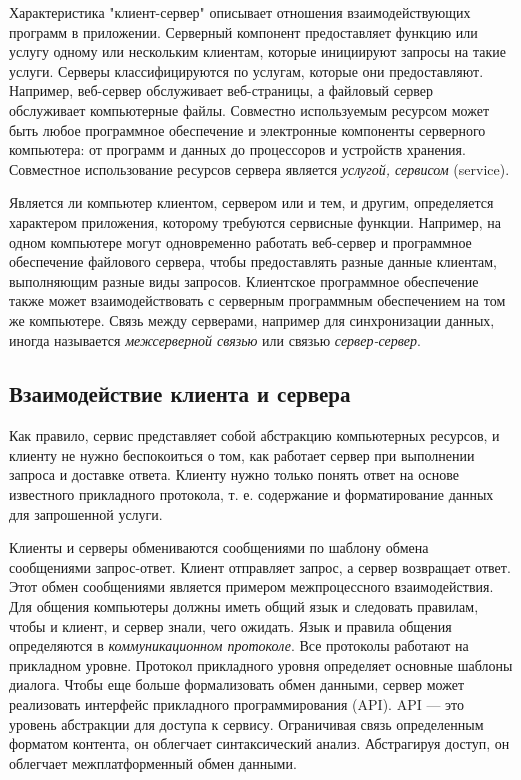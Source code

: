 Характеристика "клиент-сервер" описывает отношения взаимодействующих программ в приложении.
Серверный компонент предоставляет функцию или услугу одному или нескольким клиентам, которые инициируют запросы на такие услуги.
Серверы классифицируются по услугам, которые они предоставляют.
Например, веб-сервер обслуживает веб-страницы, а файловый сервер обслуживает компьютерные файлы.
Совместно используемым ресурсом может быть любое программное обеспечение и электронные компоненты серверного компьютера: от программ и данных до процессоров и устройств хранения.
Совместное использование ресурсов сервера является \textit{услугой, сервисом} (service).

Является ли компьютер клиентом, сервером или и тем, и другим, определяется характером приложения, которому требуются сервисные функции.
Например, на одном компьютере могут одновременно работать веб-сервер и программное обеспечение файлового сервера, чтобы предоставлять разные данные клиентам, выполняющим разные виды запросов.
Клиентское программное обеспечение также может взаимодействовать с серверным программным обеспечением на том же компьютере.
Связь между серверами, например для синхронизации данных, иногда называется \textit{межсерверной связью} или связью \textit{сервер-сервер}.

\subsection{Взаимодействие клиента и сервера}

Как правило, сервис представляет собой абстракцию компьютерных ресурсов, и клиенту не нужно беспокоиться о том, как работает сервер при выполнении запроса и доставке ответа.
Клиенту нужно только понять ответ на основе известного прикладного протокола, т. е. содержание и форматирование данных для запрошенной услуги.

Клиенты и серверы обмениваются сообщениями по шаблону обмена сообщениями запрос-ответ.
Клиент отправляет запрос, а сервер возвращает ответ.
Этот обмен сообщениями является примером межпроцессного взаимодействия.
Для общения компьютеры должны иметь общий язык и следовать правилам, чтобы и клиент, и сервер знали, чего ожидать.
Язык и правила общения определяются в \textit{коммуникационном протоколе}.
Все протоколы работают на прикладном уровне.
Протокол прикладного уровня определяет основные шаблоны диалога.
Чтобы еще больше формализовать обмен данными, сервер может реализовать интерфейс прикладного программирования (API). 
API — это уровень абстракции для доступа к сервису.
Ограничивая связь определенным форматом контента, он облегчает синтаксический анализ.
Абстрагируя доступ, он облегчает межплатформенный обмен данными.

